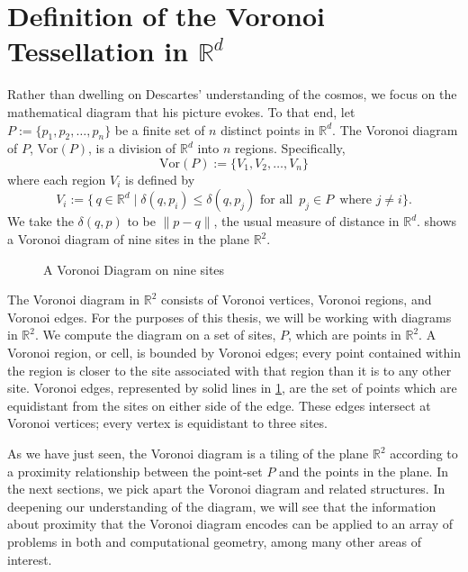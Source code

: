 \documentclass[12pt,twoside]{reedthesis}
\begin{document}
  \section{Definition of the Voronoi Tessellation in $\mathds{R}^d$} %
  \label{sec:definition_of_the_voronoi_diagram_in_rd}
    Rather than dwelling on Descartes' understanding of the cosmos, we focus on the mathematical diagram that his picture evokes. To that end, let $P:=\{p_{1}, p_{2},\ldots, p_{n}\}$ be a finite set of $n$ distinct points in $\mathds{R}^d$. The Voronoi diagram of $P$, $\mbox{Vor}(P)$, is a division of $\mathds{R}^d$ into $n$ regions. Specifically, $$\mbox{Vor}(P):=\{V_{1}, V_{2}, \ldots, V_{n}\}$$ where each region $V_{i}$ is defined by 
    $$V_{i} := \{\,q \in \mathds{R}^d \mid \delta(q, p_{i}) \leq \delta(q, p_{j}) \text{ for all }\, p_{j}\in P\,\text{ where }j\neq i \}.$$ We take the $\delta(q, p)$ to be $\lVert p-q \rVert$, the usual measure of distance in $\mathds{R}^d$. 
      shows a Voronoi diagram of nine sites in the plane $\mathds{R}^2$.\par

    \begin{figure}[!htb]
      \centering
      
      \caption{A Voronoi Diagram on nine sites}
      \label{fig:first_sight}
    \end{figure} 

    The Voronoi diagram in $\mathds{R}^2$ consists of Voronoi vertices, Voronoi regions, and Voronoi edges. For the purposes of this thesis, we will be working with diagrams in $\mathds{R}^2$. We compute the diagram on a set of sites, $P$, which are points in $\mathds{R}^2$. A Voronoi region, or cell, is bounded by Voronoi edges; every point contained within the region is closer to the site associated with that region than it is to any other site. Voronoi edges, represented by solid lines in \cref{fig:first_sight}, are the set of points which are equidistant from the sites on either side of the edge. These edges intersect at Voronoi vertices; every vertex is equidistant to three sites.\par 

    As we have just seen, the Voronoi diagram is a tiling of the plane $\mathds{R}^2$ according to a proximity relationship between the point-set $P$ and the points in the plane. In the next sections, we pick apart the Voronoi diagram and related structures. In deepening our understanding of the diagram, we will see that the information about proximity that the Voronoi diagram encodes can be applied to an array of problems in both  and computational geometry, among many other areas of interest. 
\end{document}
